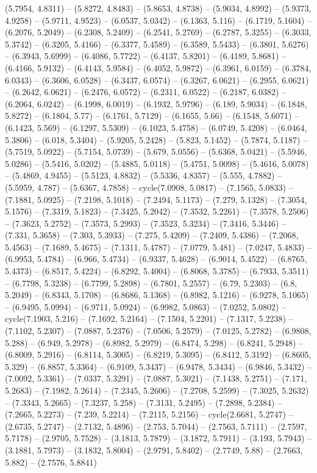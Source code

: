 (5.7954, 4.8311) -- (5.8272, 4.8483) -- (5.8653, 4.8738) -- (5.9034, 4.8992) -- (5.9373, 4.9258) -- (5.9711, 4.9523) -- (6.0537, 5.0342) -- (6.1363, 5.116) -- (6.1719, 5.1604) -- (6.2076, 5.2049) -- (6.2308, 5.2409) -- (6.2541, 5.2769) -- (6.2787, 5.3255) -- (6.3033, 5.3742) -- (6.3205, 5.4166) -- (6.3377, 5.4589) -- (6.3589, 5.5433) -- (6.3801, 5.6276) -- (6.3943, 5.6999) -- (6.4086, 5.7722) -- (6.4137, 5.8201) -- (6.4189, 5.8681) -- (6.4166, 5.9132) -- (6.4143, 5.9584) -- (6.4052, 5.9872) -- (6.3961, 6.0159) -- (6.3784, 6.0343) -- (6.3606, 6.0528) -- (6.3437, 6.0574) -- (6.3267, 6.0621) -- (6.2955, 6.0621) -- (6.2642, 6.0621) -- (6.2476, 6.0572) -- (6.2311, 6.0522) -- (6.2187, 6.0382) -- (6.2064, 6.0242) -- (6.1998, 6.0019) -- (6.1932, 5.9796) -- (6.189, 5.9034) -- (6.1848, 5.8272) -- (6.1804, 5.77) -- (6.1761, 5.7129) -- (6.1655, 5.66) -- (6.1548, 5.6071) -- (6.1423, 5.569) -- (6.1297, 5.5309) -- (6.1023, 5.4758) -- (6.0749, 5.4208) -- (6.0464, 5.3806) -- (6.018, 5.3404) -- (5.9205, 5.2428) -- (5.823, 5.1452) -- (5.7874, 5.1187) -- (5.7519, 5.0922) -- (5.7154, 5.0739) -- (5.679, 5.0556) -- (5.6368, 5.0421) -- (5.5946, 5.0286) -- (5.5416, 5.0202) -- (5.4885, 5.0118) -- (5.4751, 5.0098) -- (5.4616, 5.0078) -- (5.4869, 4.9455) -- (5.5123, 4.8832) -- (5.5336, 4.8357) -- (5.555, 4.7882) -- (5.5959, 4.787) -- (5.6367, 4.7858) -- cycle(7.0908, 5.0817) -- (7.1565, 5.0833) -- (7.1881, 5.0925) -- (7.2198, 5.1018) -- (7.2494, 5.1173) -- (7.279, 5.1328) -- (7.3054, 5.1576) -- (7.3319, 5.1823) -- (7.3425, 5.2042) -- (7.3532, 5.2261) -- (7.3578, 5.2506) -- (7.3623, 5.2752) -- (7.3573, 5.2993) -- (7.3523, 5.3234) -- (7.3416, 5.3446) -- (7.331, 5.3658) -- (7.303, 5.3933) -- (7.275, 5.4209) -- (7.2409, 5.4386) -- (7.2068, 5.4563) -- (7.1689, 5.4675) -- (7.1311, 5.4787) -- (7.0779, 5.481) -- (7.0247, 5.4833) -- (6.9953, 5.4784) -- (6.966, 5.4734) -- (6.9337, 5.4628) -- (6.9014, 5.4522) -- (6.8765, 5.4373) -- (6.8517, 5.4224) -- (6.8292, 5.4004) -- (6.8068, 5.3785) -- (6.7933, 5.3511) -- (6.7798, 5.3238) -- (6.7799, 5.2898) -- (6.7801, 5.2557) -- (6.79, 5.2303) -- (6.8, 5.2049) -- (6.8343, 5.1708) -- (6.8686, 5.1368) -- (6.8982, 5.1216) -- (6.9278, 5.1065) -- (6.9495, 5.0994) -- (6.9711, 5.0924) -- (6.9982, 5.0863) -- (7.0252, 5.0802) -- cycle(7.1903, 5.216) -- (7.1692, 5.2164) -- (7.1504, 5.2201) -- (7.1317, 5.2238) -- (7.1102, 5.2307) -- (7.0887, 5.2376) -- (7.0506, 5.2579) -- (7.0125, 5.2782) -- (6.9808, 5.288) -- (6.949, 5.2978) -- (6.8982, 5.2979) -- (6.8474, 5.298) -- (6.8241, 5.2948) -- (6.8009, 5.2916) -- (6.8114, 5.3005) -- (6.8219, 5.3095) -- (6.8412, 5.3192) -- (6.8605, 5.329) -- (6.8857, 5.3364) -- (6.9109, 5.3437) -- (6.9478, 5.3434) -- (6.9846, 5.3432) -- (7.0092, 5.3361) -- (7.0337, 5.3291) -- (7.0887, 5.3021) -- (7.1438, 5.2751) -- (7.171, 5.2683) -- (7.1982, 5.2614) -- (7.2345, 5.2606) -- (7.2708, 5.2599) -- (7.3025, 5.2632) -- (7.3343, 5.2665) -- (7.3237, 5.258) -- (7.3131, 5.2495) -- (7.2898, 5.2384) -- (7.2665, 5.2273) -- (7.239, 5.2214) -- (7.2115, 5.2156) -- cycle(2.6681, 5.2747) -- (2.6735, 5.2747) -- (2.7132, 5.4896) -- (2.753, 5.7044) -- (2.7563, 5.7111) -- (2.7597, 5.7178) -- (2.9705, 5.7528) -- (3.1813, 5.7879) -- (3.1872, 5.7911) -- (3.193, 5.7943) -- (3.1881, 5.7973) -- (3.1832, 5.8004) -- (2.9791, 5.8402) -- (2.7749, 5.88) -- (2.7663, 5.882) -- (2.7576, 5.8841) 